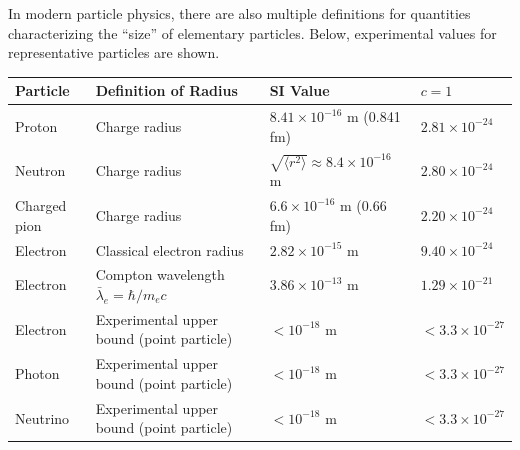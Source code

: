 \documentclass[
  a4paper,11pt]{article}
\newcounter{none}
\theoremstyle{definition}
\theoremstyle{remark}
\begin{document}
In modern particle physics, there are also multiple definitions for
quantities characterizing the ``size'' of elementary particles. Below,
experimental values for representative particles are shown.

{\def\LTcaptype{none} %
\begin{longtable}[]{@{}
  >{\raggedright\arraybackslash}p{}
  >{\raggedright\arraybackslash}p{}
  >{\raggedright\arraybackslash}p{}
  >{\raggedright\arraybackslash}p{}@{}}
\toprule\noalign{}
\begin{minipage}[b]{\linewidth}\raggedright
Particle
\end{minipage} & \begin{minipage}[b]{\linewidth}\raggedright
Definition of Radius
\end{minipage} & \begin{minipage}[b]{\linewidth}\raggedright
SI Value
\end{minipage} & \begin{minipage}[b]{\linewidth}\raggedright
\(c=1\)
\end{minipage} \\
\midrule\noalign{}
\endhead
\bottomrule\noalign{}
\endlastfoot
Proton & Charge radius & \(8.41 \times 10^{-16}\) m (0.841 fm) &
\(2.81 \times 10^{-24}\) \\
Neutron & Charge radius &
\(\sqrt{\langle r^2 \rangle} \approx 8.4 \times 10^{-16}\) m &
\(2.80 \times 10^{-24}\) \\
Charged pion & Charge radius & \(6.6 \times 10^{-16}\) m (0.66 fm) &
\(2.20 \times 10^{-24}\) \\
Electron & Classical electron radius & \(2.82 \times 10^{-15}\) m &
\(9.40 \times 10^{-24}\) \\
Electron & Compton wavelength \(\bar{\lambda}_e = \hbar / m_e c\) &
\(3.86 \times 10^{-13}\) m & \(1.29 \times 10^{-21}\) \\
Electron & Experimental upper bound (point particle) & \(< 10^{-18}\) m
& \(< 3.3 \times 10^{-27}\) \\
Photon & Experimental upper bound (point particle) & \(< 10^{-18}\) m &
\(< 3.3 \times 10^{-27}\) \\
Neutrino & Experimental upper bound (point particle) & \(< 10^{-18}\) m
& \(< 3.3 \times 10^{-27}\) \\
\end{longtable}
}
\end{document}

